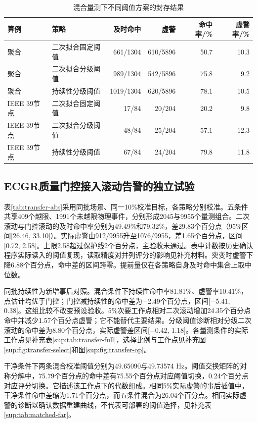 \documentclass[UTF8,a4paper,11pt]{ctexart}
\begin{document}
\begin{table}[htbp]
\centering
\caption{混合量测下不同阈值方案的封存结果}\label{tab:r2}
\begin{tabular}{llrrrr}
\toprule
算例 & 策略 & 及时命中 & 虚警 & 命中率/\% & 虚警率/\%\\
\midrule
聚合 & 二次拟合固定阈值 & 661/1304 & 610/5896 & 50.7 & 10.3\\
聚合 & 二次拟合分级阈值 & 989/1304 & 542/5896 & 75.8 & 9.2\\
聚合 & 持续性分级阈值 & 1019/1304 & 620/5896 & 78.1 & 10.5\\
IEEE 39节点 & 二次拟合固定阈值 & 17/84 & 20/204 & 20.2 & 9.8\\
IEEE 39节点 & 二次拟合分级阈值 & 48/84 & 25/204 & 57.1 & 12.3\\
IEEE 39节点 & 持续性分级阈值 & 67/84 & 24/204 & 79.8 & 11.8\\
\bottomrule
\end{tabular}
\end{table}

\subsection{ECGR质量门控接入滚动告警的独立试验}
表\ref{tab:transfer-abs}采用同批场景、同一10\%校准目标，各策略分别校准。五条件共享409个越限、1991个未越限物理事件，分别形成2045与9955个量测组合。二次滚动与门控滚动的及时命中率分别为49.49\%和79.32\%，差29.83个百分点（95\%区间[26.46, 33.10]）。实际虚警由912/9955升至1076/9955，差1.65个百分点，区间[0.72, 2.58]。上限2.58超过保护线2个百分点，主验收未通过。表中计数按历史确认程序实际读入的阈值复现，读取精度对并列评分的影响见补充材料。突变时虚警下降6.88个百分点，命中差的区间跨零。提前量仅在各策略自身及时命中集合上取中位数。

同批持续性为新增事后对照。混合条件下持续性命中率81.81\%、虚警率10.41\%，点估计均优于门控；门控减持续性的命中差为−2.49个百分点，区间[−5.41, 0.38]。这组比较不改变预设验收。5\%次要工作点相对二次滚动增加24.35个百分点命中并减少1.57个百分点虚警；它不能替代主要结果。分级阈值诊断相对分级二次滚动的命中差为8.80个百分点，实际虚警差区间[−0.42, 1.18]。各量测条件的实际工作点见补充表\ref{sup:tab:transfer-full}，选择比例与工作点见补充图\ref{sup:fig:transfer-select}和图\ref{sup:fig:transfer-op}。

干净条件下两条混合校准阈值分别为49.65090与49.73574 Hz。阈值交换矩阵的对称分解中，75.79个百分点的命中差有75.55个百分点对应阈值切换，0.24个百分点对应评分切换。它描述该工作点下的代数组成。相同5\%实际虚警的事后插值中，干净条件命中差缩为1.71个百分点，而五条件混合为26.04个百分点。相同实际虚警的诊断以确认数据重建曲线，不代表可部署的阈值选择，见补充表\ref{sup:tab:matched-far}。
\end{document}
